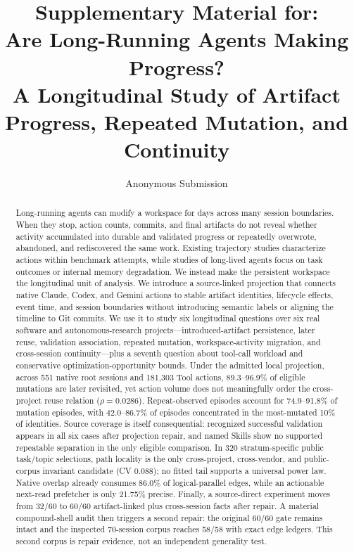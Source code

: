\documentclass[letterpaper]{article}
\title{Supplementary Material for:\\
Are Long-Running Agents Making Progress?\\
A Longitudinal Study of Artifact Progress, Repeated Mutation, and Continuity}
\author{Anonymous Submission}
\begin{document}
\maketitle

\begin{abstract}
Long-running agents can modify a workspace for days across many session boundaries.
When they stop, action counts, commits, and final artifacts do not reveal
whether activity accumulated into durable and validated progress or repeatedly
overwrote, abandoned, and rediscovered the same work.  Existing trajectory
studies characterize actions within benchmark attempts, while studies of
long-lived agents focus on task outcomes or internal memory degradation.  We
instead make the persistent workspace the longitudinal unit of analysis.
We introduce a source-linked projection that connects native Claude, Codex, and
Gemini actions to stable artifact identities, lifecycle effects, event time,
and session boundaries without introducing semantic labels or aligning the
timeline to Git commits.  We use it to study six longitudinal questions over
six real software and autonomous-research projects---introduced-artifact
persistence, later reuse, validation association, repeated mutation,
workspace-activity migration, and cross-session continuity---plus a seventh
question about tool-call workload and conservative optimization-opportunity
bounds.  Under the admitted local projection, across 551
native root sessions and 181,303 Tool actions,
89.3--96.9\% of eligible mutations are later revisited, yet action volume does
not meaningfully order the cross-project reuse relation ($\rho=0.0286$).
Repeat-observed episodes account for 74.9--91.8\% of mutation episodes, with 42.0--86.7\% of
episodes concentrated in the most-mutated 10\% of identities.  Source coverage
is itself consequential: recognized successful validation appears in all six
cases after projection repair, and named Skills show no supported repeatable
separation in the only eligible comparison.  In 320 stratum-specific public
task/topic selections,
path locality is the only cross-project, cross-vendor, and public-corpus
invariant candidate (CV 0.088); no fitted tail supports a universal power law.
Native overlap already consumes 86.0\% of logical-parallel edges, while an
actionable next-read prefetcher is only 21.75\% precise.  Finally, a
source-direct experiment moves from 32/60 to 60/60 artifact-linked plus
cross-session facts after repair.  A material compound-shell audit then
triggers a second repair: the original 60/60 gate remains intact and the
inspected 70-session corpus reaches 58/58 with exact edge ledgers.  This second
corpus is repair evidence, not an independent generality test.
\end{abstract}
\end{document}
